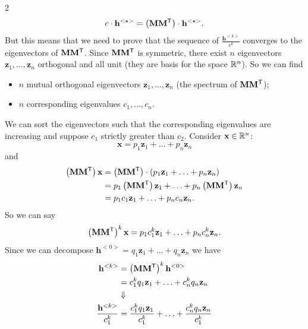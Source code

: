 \documentclass[a4paper,9pt]{extarticle}
\begin{document}
\begin{multicols*}{2}
\begin{equation*}
			c\cdot\mathbf{h}^{<\star>}=\left(\mathbf{M}{\mathbf{M}}^{\mathsf{T}}\right)\cdot\mathbf{h}^{<\star>}.
		\end{equation*}
		But this means that we need to prove that the sequence of $\frac{\mathbf{h}^{<k>}}{c^{k}}$ converges to the eigenvectors of $\mathbf{M}{\mathbf{M}}^{\mathsf{T}}$.
		Since $\mathbf{M}{\mathbf{M}}^{\mathsf{T}}$ is symmetric, there exist $n$ eigenvectors $\mathbf{z}_{1},\ldots,\mathbf{z}_{n}$ orthogonal and all unit (they are basis for the space $\mathbb{R}^{n}$). So we can find
		\begin{itemize}
			\item $n$ mutual orthogonal eigenvectors $\mathbf{z}_{1},\ldots,\mathbf{z}_{n}$ (the spectrum of $\mathbf{M}{\mathbf{M}}^{\mathsf{T}}$);
			\item $n$ corresponding eigenvalues $c_{1},\ldots,c_{n}$.
		\end{itemize}
		We can sort the eigenvectors such that the corresponding eigenvalues are increasing and suppose $c_1$ strictly greater than $c_{2}$. Consider $\mathbf{x}\in\mathbb{R}^{n}$:
		\begin{equation*}
			\mathbf{x}=p_{1}\mathbf{z}_{1}+\ldots+p_{n}\mathbf{z}_{n}
		\end{equation*}
		and
		\begin{align*}
			\left(\mathbf{M}{\mathbf{M}}^{\mathsf{T}}\right)\mathbf{x}&=\left(\mathbf{M}{\mathbf{M}}^{\mathsf{T}}\right)\cdot\left(p_{1}\mathbf{z}_{1}+\ldots+p_{n}\mathbf{z}_{n}\right)\\
		&=p_{1}	\left(\mathbf{M}{\mathbf{M}}^{\mathsf{T}}\right)\mathbf{z}_{1}+\ldots+p_{n}	\left(\mathbf{M}{\mathbf{M}}^{\mathsf{T}}\right)\mathbf{z}_{n}\\
		&=p_{1}c_{1}\mathbf{z}_{1}+\ldots+p_{n}c_{n}\mathbf{z}_{n}.
		\end{align*}
		So we can say
		\begin{equation*}
			\left(\mathbf{M}{\mathbf{M}}^{\mathsf{T}}\right)^{k}\mathbf{x}=p_{1}c_{1}^{k}\mathbf{z}_{1}+\ldots+p_{n}c_{n}^{k}\mathbf{z}_{n}.
		\end{equation*}
		Since we can decompose $\mathbf{h}^{<0>}=q_{1}\mathbf{z}_{1}+\ldots+q_{n}\mathbf{z}_{n}$ we have
		\begin{align*}
			\mathbf{h}^{<k>}&=\left(\mathbf{M}\trans{\mathbf{M}}\right)^{k}\mathbf{h}^{<0>}\\
			&=c^{k}_{1}q_{1}\mathbf{z}_{1}+\ldots+c^{k}_{n}q_{n}\mathbf{z}_{n}\\
			&\Downarrow\\
			\frac{	\mathbf{h}^{<k>}}{c_{1}^{k}}&=\frac{c^{k}_{1}q_{1}\mathbf{z}_{1}}{c_{1}^{k}}+\ldots+\frac{c^{k}_{n}q_{n}\mathbf{z}_{n}}{c^{k}_{1}}

\end{align*}
\end{multicols*}
\end{document}
